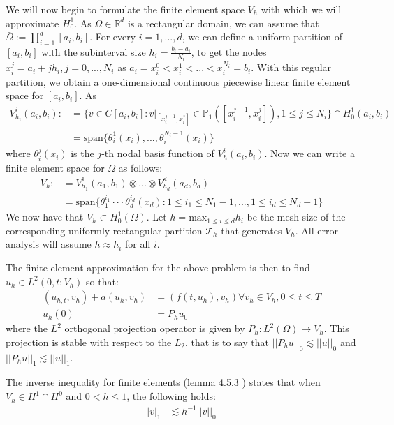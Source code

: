 We will now begin to formulate the finite element space $V_h$ with which we will approximate $H^1_0$.
As $\Omega \in \mathbb{R}^d$ is a rectangular domain, we can assume that $\bar \Omega := \prod^d_{i=1}[a_i,b_i]$.
For every $i = 1,...,d$, we can define a uniform partition of $[a_i,b_i]$ with the subinterval size $h_i = \frac{b_i - a_i}{N_i}$,
to get the nodes $x^j_i = a_i + jh_i, j = 0,...,N_i$ as $a_i = x_i^0 < x_i^1 < ... < x_i^{N_i} = b_i$.
With this regular partition, we obtain a one-dimensional continuous piecewise linear finite element space for $[a_i,b_i]$.
As
\begin{align*}
    V^i_{h_i}(a_i,b_i) :&= \{v\in C[a_i,b_i]: v|_{[x^{j-1}_i, x^j_i]}\in\mathbb{P}_1([x_i^{j-1},x_i^j]),1\leq j \leq N_i\} \cap H^1_0(a_i,b_i)\\
    &=\text{span}\{\theta^1_i(x_i), ... , \theta^{N_i-1}_i(x_i)\} 
\end{align*}
where $\theta^j_i(x_i)$ is the $j$-th nodal basis function of $V_h^i(a_i,b_i)$. 
Now we can write a finite element space for $\Omega$ as follows:
\begin{align*}
    V_h :&= V_{h_1}^1(a_1,b_1) \otimes ... \otimes V^d_{h_d}(a_d,b_d)\\
    &= \text{span}\{\theta_1^{i_1}\cdot \cdot \cdot \theta_d^{i_d}(x_d): 1 \leq i_1 \leq N_1-1,...,1\leq i_d \leq N_d-1\}
\end{align*}
We now have that $V_h\subset H^1_0(\Omega)$.
Let $h=\text{max}_{1\leq i\leq d}h_i$ be the mesh size of the corresponding uniformly rectangular partition $\mathcal{T}_h$ that generates $V_h$.
All error analysis will assume $h\approx h_i$ for all $i$.

The finite element approximation for the above problem is then to find $u_h \in L^2(0,t:V_h)$ so that:
\begin{align*}
    (u_{h,t},v_h) + a(u_h,v_h) &=(f(t,u_h),v_h) \forall v_h \in V_h, 0\leq t \leq T\\
    u_h(0) &= P_hu_0
\end{align*}
where the $L^2$ orthogonal projection operator is given by $P_h:L^2(\Omega) \rightarrow V_h$.
This projection is stable with respect to the $L_2$, that is to say that $||P_hu||_0 \lesssim ||u||_0$ and $||P_hu||_1 \lesssim ||u||_1$.

The inverse inequality for finite elements (lemma 4.5.3 \cite{Brenner2008}) states that when $V_h \in H^1 \cap H^0$ and $0 < h \leq 1$,
the following holds:
\begin{align*}
    |v|_1 &\lesssim h^{-1} ||v||_0
\end{align*}

